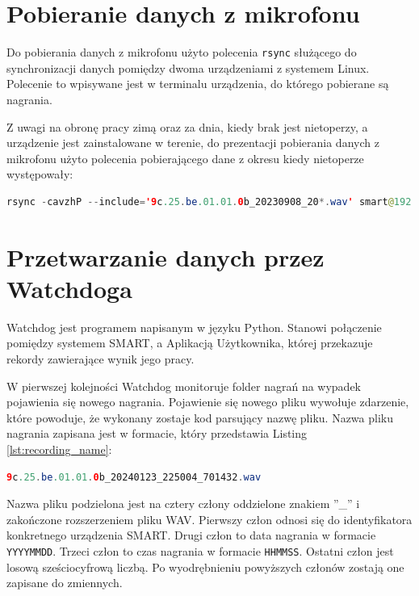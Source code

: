 \documentclass{sprz}
\begin{document}
\section{Pobieranie danych z mikrofonu}
Do pobierania danych z mikrofonu użyto polecenia \verb|rsync| służącego do synchronizacji danych pomiędzy dwoma urządzeniami z systemem Linux. Polecenie to wpisywane jest w terminalu urządzenia, do którego pobierane są nagrania.

Z uwagi na obronę pracy zimą oraz za dnia, kiedy brak jest nietoperzy, a urządzenie jest zainstalowane w terenie, do prezentacji pobierania danych z mikrofonu użyto polecenia pobierającego dane z okresu kiedy nietoperze występowały:

\begin{lstlisting}[language=Java,caption={Polecenie rsync pobierające dane z pewnego okresu czasu}, label={lst:rsync_command}]
  rsync -cavzhP --include='9c.25.be.01.01.0b_20230908_20*.wav' smart@192.168.3.2:/var/www/html/storage/devices/9c.25.be.01.01.0b/data/wav/ /home/batmonit/batmonit/recordings/
\end{lstlisting}

\section{Przetwarzanie danych przez Watchdoga}

Watchdog jest programem napisanym w języku Python. Stanowi połączenie pomiędzy systemem SMART, a Aplikacją Użytkownika, której przekazuje rekordy zawierające wynik jego pracy.

W pierwszej kolejności Watchdog monitoruje folder nagrań na wypadek pojawienia się nowego nagrania. Pojawienie się nowego pliku wywołuje zdarzenie, które powoduje, że wykonany zostaje kod parsujący nazwę pliku. Nazwa pliku nagrania zapisana jest w formacie, który przedstawia Listing \ref{lst:recording_name}:

\begin{lstlisting}[language=Java,caption={Przykładowa nazwa pliku nagrania}, label={lst:recording_name}]
  9c.25.be.01.01.0b_20240123_225004_701432.wav
\end{lstlisting}

Nazwa pliku podzielona jest na cztery człony oddzielone znakiem ”\_” i zakończone rozszerzeniem pliku WAV. Pierwszy człon odnosi się do identyfikatora konkretnego urządzenia SMART. Drugi człon to data nagrania w formacie \verb|YYYYMMDD|. Trzeci człon to czas nagrania w formacie \verb|HHMMSS|. Ostatni człon jest losową sześciocyfrową liczbą. Po wyodrębnieniu powyższych członów zostają one zapisane do zmiennych.
\end{document}
